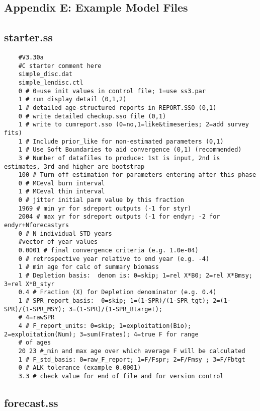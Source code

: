 \begin{landscape}

\section{Appendix E: Example Model Files}


\subsection{starter.ss}

\begin{verbatim}
	#V3.30a
	#C starter comment here
	simple_disc.dat
	simple_lendisc.ctl
	0 # 0=use init values in control file; 1=use ss3.par
	1 # run display detail (0,1,2)
	1 # detailed age-structured reports in REPORT.SSO (0,1) 
	0 # write detailed checkup.sso file (0,1) 
	1 # write to cumreport.sso (0=no,1=like&timeseries; 2=add survey fits)
	1 # Include prior_like for non-estimated parameters (0,1) 
	1 # Use Soft Boundaries to aid convergence (0,1) (recommended)
	3 # Number of datafiles to produce: 1st is input, 2nd is estimates, 3rd and higher are bootstrap
	100 # Turn off estimation for parameters entering after this phase
	0 # MCeval burn interval
	1 # MCeval thin interval
	0 # jitter initial parm value by this fraction
	1969 # min yr for sdreport outputs (-1 for styr)
	2004 # max yr for sdreport outputs (-1 for endyr; -2 for endyr+Nforecastyrs
	0 # N individual STD years 
	#vector of year values 	
	0.0001 # final convergence criteria (e.g. 1.0e-04) 
	0 # retrospective year relative to end year (e.g. -4)
	1 # min age for calc of summary biomass
	1 # Depletion basis:  denom is: 0=skip; 1=rel X*B0; 2=rel X*Bmsy; 3=rel X*B_styr
	0.4 # Fraction (X) for Depletion denominator (e.g. 0.4)
	1 # SPR_report_basis:  0=skip; 1=(1-SPR)/(1-SPR_tgt); 2=(1-SPR)/(1-SPR_MSY); 3=(1-SPR)/(1-SPR_Btarget);
	# 4=rawSPR
	4 # F_report_units: 0=skip; 1=exploitation(Bio); 2=exploitation(Num); 3=sum(Frates); 4=true F for range 
	# of ages
	20 23 #_min and max age over which average F will be calculated
	1 # F_std_basis: 0=raw_F_report; 1=F/Fspr; 2=F/Fmsy ; 3=F/Fbtgt
	0 # ALK tolerance (example 0.0001)
	3.3 # check value for end of file and for version control
\end{verbatim}

\subsection{forecast.ss}


\end{landscape}
